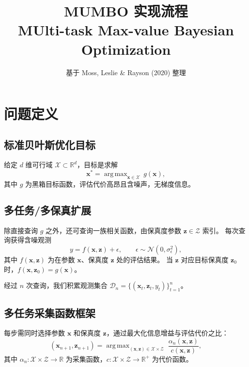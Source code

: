 \documentclass[11pt,a4paper]{article}
\title{\textbf{MUMBO 实现流程}\\[4pt]
\large MUlti-task Max-value Bayesian Optimization}
\author{基于 Moss, Leslie \& Rayson (2020) 整理}
\date{}
\newcommand{\bx}{\mathbf{x}}
\newcommand{\bz}{\mathbf{z}}
\newcommand{\cX}{\mathcal{X}}
\newcommand{\cZ}{\mathcal{Z}}
\newcommand{\cD}{\mathcal{D}}
\newcommand{\R}{\mathbb{R}}
\DeclareMathOperator*{\argmax}{arg\,max}
\begin{document}
\maketitle

\section{问题定义}

\subsection{标准贝叶斯优化目标}

给定 $d$ 维可行域 $\cX\subset\R^{d}$，目标是求解
\begin{equation}\label{eq:bo-obj}
  \bx^{*} = \argmax_{\bx\in\cX}\, g(\bx),
\end{equation}
其中 $g$ 为黑箱目标函数，评估代价高昂且含噪声，无梯度信息。

\subsection{多任务/多保真扩展}

除直接查询 $g$ 之外，还可查询一族相关函数，由保真度参数 $\bz\in\cZ$ 索引。
每次查询获得含噪观测
\begin{equation}
  y = f(\bx,\bz) + \epsilon, \qquad \epsilon\sim\mathcal{N}(0,\sigma_\epsilon^{2}),
\end{equation}
其中 $f(\bx,\bz)$ 为在参数 $\bx$、保真度 $\bz$ 处的评估结果。
当 $\bz$ 对应目标保真度 $\bz_0$ 时，$f(\bx,\bz_0)=g(\bx)$。

经过 $n$ 次查询，我们积累观测集合 $\cD_n = \{(\bx_t,\bz_t,y_t)\}_{t=1}^{n}$。

\subsection{多任务采集函数框架}

每步需同时选择参数 $\bx$ 和保真度 $\bz$，通过最大化信息增益与评估代价之比：
\begin{equation}\label{eq:acq-ratio}
  (\bx_{n+1},\bz_{n+1}) = \argmax_{(\bx,\bz)\in\cX\times\cZ}\;
  \frac{\alpha_n(\bx,\bz)}{c(\bx,\bz)},
\end{equation}
其中 $\alpha_n:\cX\times\cZ\to\R$ 为采集函数，$c:\cX\times\cZ\to\R^{+}$ 为代价函数。

\end{document}
